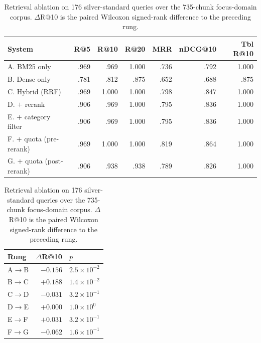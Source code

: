 \documentclass[preprint,3p,times]{elsarticle}
\begin{document}
\begin{table}[t]
\caption{Retrieval ablation on 176 silver-standard queries over the
735-chunk focus-domain corpus. $\Delta$R@10 is the
paired Wilcoxon signed-rank difference to the preceding rung.}
\label{tab:ablation}
\centering
\small
\begin{tabular}{lrrrrrr}
\toprule
System & R@5 & R@10 & R@20 & MRR & nDCG@10 & Tbl R@10 \\
\midrule
A. BM25 only & .969 & .969 & 1.000 & .736 & .792 & 1.000 \\
B. Dense only & .781 & .812 & .875 & .652 & .688 & .875 \\
C. Hybrid (RRF) & .969 & 1.000 & 1.000 & .798 & .847 & 1.000 \\
D. \quad$+$ rerank & .906 & .969 & 1.000 & .795 & .836 & 1.000 \\
E. \quad$+$ category filter & .906 & .969 & 1.000 & .795 & .836 & 1.000 \\
F. \quad$+$ quota (pre-rerank) & .969 & 1.000 & 1.000 & .819 & .864 & 1.000 \\
G. \quad$+$ quota (post-rerank) & .906 & .938 & .938 & .789 & .826 & 1.000 \\
\bottomrule
\end{tabular}
\vspace{4pt}
\begin{tabular}{lrl}
\toprule
Rung & $\Delta$R@10 & $p$ \\
\midrule
A$\to$B & $-0.156$ & $2.5\!\times\!10^{-2}$ \\
B$\to$C & $+0.188$ & $1.4\!\times\!10^{-2}$ \\
C$\to$D & $-0.031$ & $3.2\!\times\!10^{-1}$ \\
D$\to$E & $+0.000$ & $1.0\!\times\!10^{0}$ \\
E$\to$F & $+0.031$ & $3.2\!\times\!10^{-1}$ \\
F$\to$G & $-0.062$ & $1.6\!\times\!10^{-1}$ \\
\bottomrule
\end{tabular}
\end{table}

\end{document}
